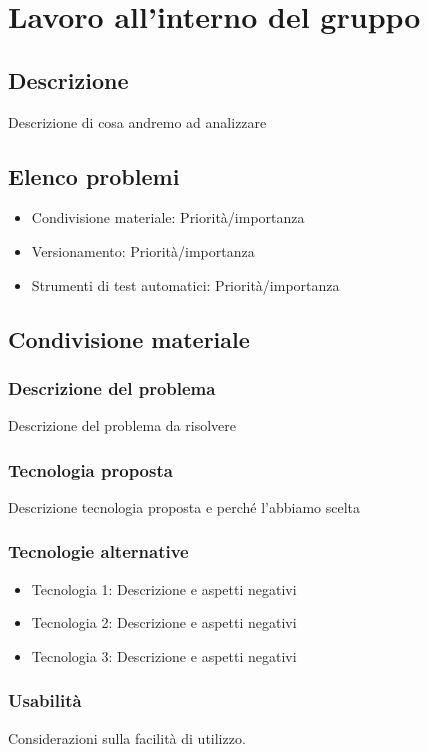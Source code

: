 \documentclass[./../Technology Baseline.tex]{subfiles}
\begin{document}
	
\chapter{Lavoro all'interno del gruppo }
\section{Descrizione}
Descrizione di cosa andremo ad analizzare

\section{Elenco problemi}
\begin{itemize}
	\item{Condivisione materiale: } Priorità/importanza
	\item{Versionamento: } Priorità/importanza
	\item{Strumenti di test automatici: } Priorità/importanza
\end{itemize}


\section{Condivisione materiale}

\subsection{Descrizione del problema}
Descrizione del problema da risolvere

\subsection{Tecnologia proposta}
Descrizione tecnologia proposta e perché l'abbiamo scelta

\subsection{Tecnologie alternative}
\begin{itemize}
	\item{Tecnologia 1:} Descrizione e aspetti negativi
	\item{Tecnologia 2:} Descrizione e aspetti negativi
	\item{Tecnologia 3:} Descrizione e aspetti negativi
\end{itemize}


\subsection{Usabilità}
Considerazioni sulla facilità di utilizzo.
\end{document}
